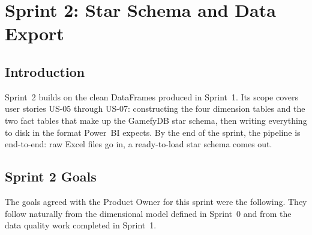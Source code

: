 
\providecommand{\todoFigure}[2][0.7\textwidth]{%
  \fcolorbox{red!60!black}{red!5}{%
    \parbox{#1}{\centering\vspace{0.6cm}%
      \textcolor{red!60!black}{\textbf{[TODO --- insert figure]}}\\[4pt]
      \textit{#2}\vspace{0.6cm}}}%
}

\chapter{Sprint 2: Star Schema and Data Export}

\section{Introduction}

Sprint~2 builds on the clean DataFrames produced in Sprint~1. Its scope covers user
stories US-05 through US-07: constructing the four dimension tables and the two fact
tables that make up the GamefyDB star schema, then writing everything to disk in the
format Power~BI expects. By the end of the sprint, the pipeline is end-to-end: raw
Excel files go in, a ready-to-load star schema comes out.

\section{Sprint 2 Goals}

The goals agreed with the Product Owner for this sprint were the following.
They follow naturally from the dimensional model defined in Sprint~0 and from
the data quality work completed in Sprint~1.

